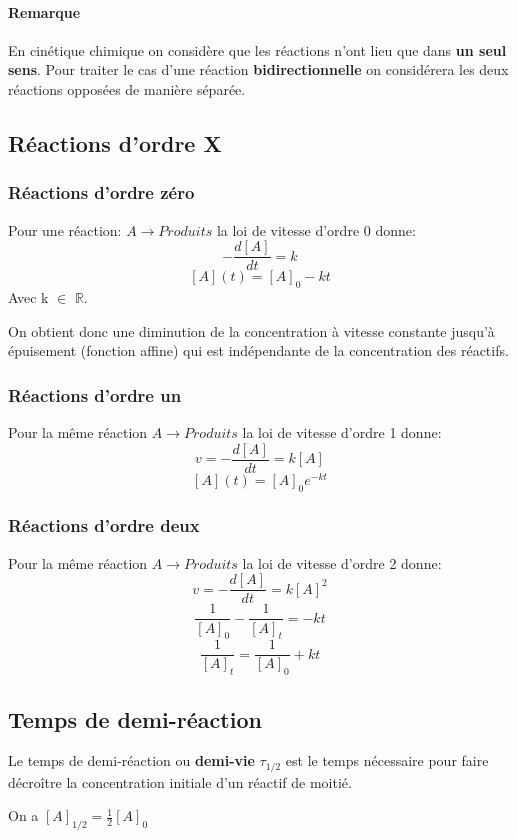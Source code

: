 \documentclass[10pt,a4paper]{book}
\newcommand{\R}{\mathbb{R}}
\begin{document}
\paragraph{Remarque} En cinétique chimique on considère que les réactions n'ont lieu que dans \textbf{un seul sens}. Pour traiter le cas d'une réaction \textbf{bidirectionnelle} on considérera les deux réactions opposées de manière séparée.

\subsection{Réactions d'ordre X}

\subsubsection{Réactions d'ordre zéro}

Pour une réaction: \(A \longrightarrow Produits\) la loi de vitesse d'ordre 0 donne:
\[-\frac{d[A]}{dt} = k\]
\[[A](t) = [A]_0 - kt\]
Avec k $\in$ $\R$. \par
On obtient donc une diminution de la concentration à vitesse constante jusqu'à épuisement (fonction affine) qui est indépendante de la concentration des réactifs.

\subsubsection{Réactions d'ordre un}

Pour la même réaction \(A \longrightarrow Produits\) la loi de vitesse d'ordre 1 donne:
\[v = -\frac{d[A]}{dt} = k[A]\]
\[[A](t) = [A]_0e^{-kt}\]

\subsubsection{Réactions d'ordre deux}

Pour la même réaction \(A \longrightarrow Produits\) la loi de vitesse d'ordre 2 donne:
\[v = -\frac{d[A]}{dt} = k[A]^2\]
\[\frac{1}{[A]_0} - \frac{1}{[A]_t} = -kt\]
\[\frac{1}{[A]_t} = \frac{1}{[A]_0} + kt\]

\subsection{Temps de demi-réaction}

Le temps de demi-réaction ou \textbf{demi-vie} $\tau_{1/2}$ est le temps nécessaire pour faire décroître la concentration initiale d'un réactif de moitié. \par
On a \([A]_{1/2} = \frac{1}{2}[A]_0\)
\end{document}

